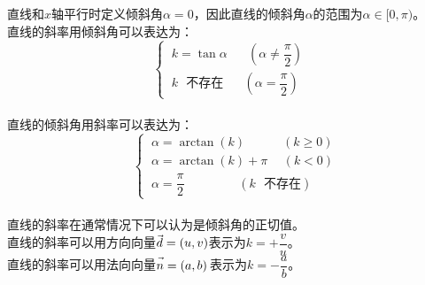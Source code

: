 \documentclass[UTF8]{ctexart}
\let\nvec\vec
\def\vec#1{\nvec{\vphantom b\smash{#1}}}
\begin{document}
    直线和$x$轴平行时定义倾斜角$\alpha=0$，因此直线的倾斜角$\alpha$的范围为$\alpha\in[0,\pi)$。\\[3mm]
    直线的斜率用倾斜角可以表达为：
    \begin{equation*}
        \begin{cases}
            ~k=\tan{\alpha}\hspace{20pt}(\alpha\neq\dfrac{\pi}{2})\\[4mm]
            ~k\text{~~不存在}\hspace{20pt}(\alpha=\dfrac{\pi}{2})
        \end{cases}
    \end{equation*}\\
    直线的倾斜角用斜率可以表达为：\vspace{3pt}
    \begin{equation*}
        ~~~~
        \begin{cases}
            ~\alpha=\arctan(k)\hspace{36pt}(k\geq 0)\\[3mm]
            ~\alpha=\arctan(k)+\pi\hspace{15pt}(k<0)\\[3mm]
            ~\alpha=\dfrac{\pi}{2}\hspace{52pt}(k\text{~~不存在})
        \end{cases}
    \end{equation*}\\[2mm]
    直线的斜率在通常情况下可以认为是倾斜角的正切值。\\[6mm]
    直线的斜率可以用方向向量$\vec{d}=(u,v)$表示为$k=+\dfrac{v}{u}$。\\[6mm]
    直线的斜率可以用法向向量$\vec{n}=(a,b)\hspace{1.5pt}$表示为$k=-\dfrac{a}{b}$。

\newpage
\end{document}
